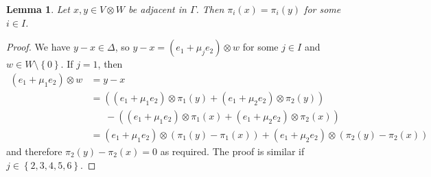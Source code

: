 \documentclass[10pt]{amsart}
\theoremstyle{definition}
\theoremstyle{plain}
\newtheorem{lemma}[lemma]{Lemma}
\theoremstyle{plain}
\theoremstyle{plain}
\theoremstyle{plain}
\begin{document}
\begin{lemma} \label{lm:adjacency-implies-clique}
Let $x, y \in V \otimes W$ be adjacent in $\Gamma$. Then $\pi_i{\left(x \right)} = \pi_i{\left(y \right)}$ for some $i \in I$.
\end{lemma}
\begin{proof}
We have $y-x \in \Delta$, so $y-x = \left(e_1 + \mu_j e_2 \right) \otimes w$ for some $j \in I$ and $w \in W \setminus \left\{0 \right\}$. If $j=1$, then
\begin{align*}
    \left(e_1 + \mu_1 e_2 \right) \otimes w &= y-x \\
    &= \left(\left(e_1 + \mu_1 e_2 \right) \otimes \pi_1{\left(y \right)} + \left(e_1 + \mu_2 e_2 \right) \otimes \pi_2{\left(y \right)}\right) \\
    &\ \ \ \ \ \ \ - \left(\left(e_1 + \mu_1 e_2 \right) \otimes \pi_1{\left(x \right)} + \left(e_1 + \mu_2 e_2 \right) \otimes \pi_2{\left(x \right)}\right) \\
    &= \left(e_1 + \mu_1 e_2 \right) \otimes \left(\pi_1{\left(y \right)} - \pi_1{\left(x \right)}\right) + \left(e_1 + \mu_2 e_2 \right) \otimes \left(\pi_2{\left(y \right)} - \pi_2{\left(x \right)}\right)
\end{align*}
and therefore $\pi_2{\left(y \right)} - \pi_2{\left(x \right)} = 0$ as required. The proof is similar if $j \in \left\{2, 3, 4, 5, 6 \right\}$.
\end{proof}
\end{document}

